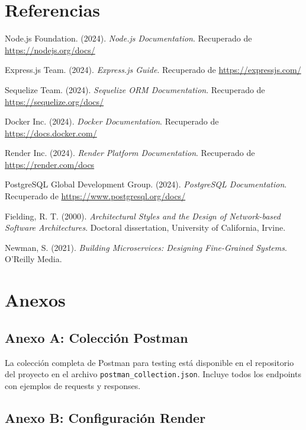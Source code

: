 \documentclass[12pt,a4paper]{article}
\begin{document}
\section{Referencias}

\begin{thebibliography}{9}

Node.js Foundation. (2024). \textit{Node.js Documentation}. Recuperado de \url{https://nodejs.org/docs/}

Express.js Team. (2024). \textit{Express.js Guide}. Recuperado de \url{https://expressjs.com/}

Sequelize Team. (2024). \textit{Sequelize ORM Documentation}. Recuperado de \url{https://sequelize.org/docs/}

Docker Inc. (2024). \textit{Docker Documentation}. Recuperado de \url{https://docs.docker.com/}

Render Inc. (2024). \textit{Render Platform Documentation}. Recuperado de \url{https://render.com/docs}

PostgreSQL Global Development Group. (2024). \textit{PostgreSQL Documentation}. Recuperado de \url{https://www.postgresql.org/docs/}

Fielding, R. T. (2000). \textit{Architectural Styles and the Design of Network-based Software Architectures}. Doctoral dissertation, University of California, Irvine.

Newman, S. (2021). \textit{Building Microservices: Designing Fine-Grained Systems}. O'Reilly Media.

\end{thebibliography}

\section{Anexos}

\subsection{Anexo A: Colección Postman}

La colección completa de Postman para testing está disponible en el repositorio del proyecto en el archivo \texttt{postman\_collection.json}. Incluye todos los endpoints con ejemplos de requests y responses.

\subsection{Anexo B: Configuración Render}
\end{document}
